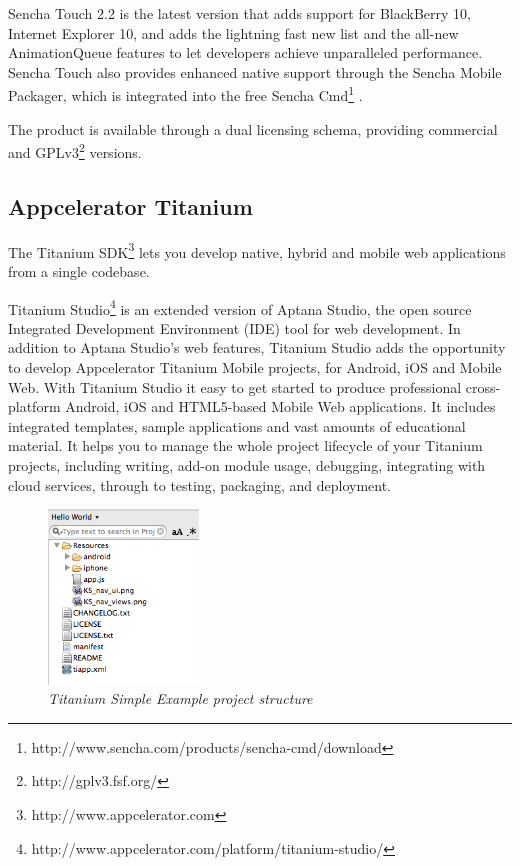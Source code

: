 \documentclass[a4paper,12pt]{book}
\begin{document}
Sencha Touch 2.2 is the latest version that adds support for BlackBerry 10, Internet Explorer 10, and adds the lightning fast new list and the all-new AnimationQueue features to let developers achieve unparalleled performance. Sencha Touch also provides enhanced native support through the Sencha Mobile Packager, which is integrated into the free Sencha Cmd\footnote{http://www.sencha.com/products/sencha-cmd/download} . 

The product is available through a dual licensing schema, providing commercial and GPLv3\footnote{http://gplv3.fsf.org/}  versions. 

\subsection{Appcelerator Titanium}
\label{Appcelerator Titanium} 

The Titanium SDK\footnote{http://www.appcelerator.com} lets you develop native, hybrid and mobile web applications from a single codebase. 

Titanium Studio\footnote{http://www.appcelerator.com/platform/titanium-studio/} is an extended version of Aptana Studio, the open source Integrated Development Environment (IDE) tool for web development. In addition to Aptana Studio's web features, Titanium Studio adds the opportunity to develop Appcelerator Titanium Mobile projects, for Android, iOS and Mobile Web. With Titanium Studio it easy to get started to produce professional cross-platform Android, iOS and HTML5-based Mobile Web applications. It includes integrated templates, sample applications and vast amounts of educational material. It helps you to manage the whole project lifecycle of your Titanium projects, including writing, add-on module usage, debugging, integrating with cloud services, through to testing, packaging, and deployment.

\begin{figure}[H]
    \centering
    \includegraphics[width=4cm, keepaspectratio]{img/titanium.png}
    \caption{\textit{Titanium Simple Example project structure}}
 \end{figure}
\end{document}
